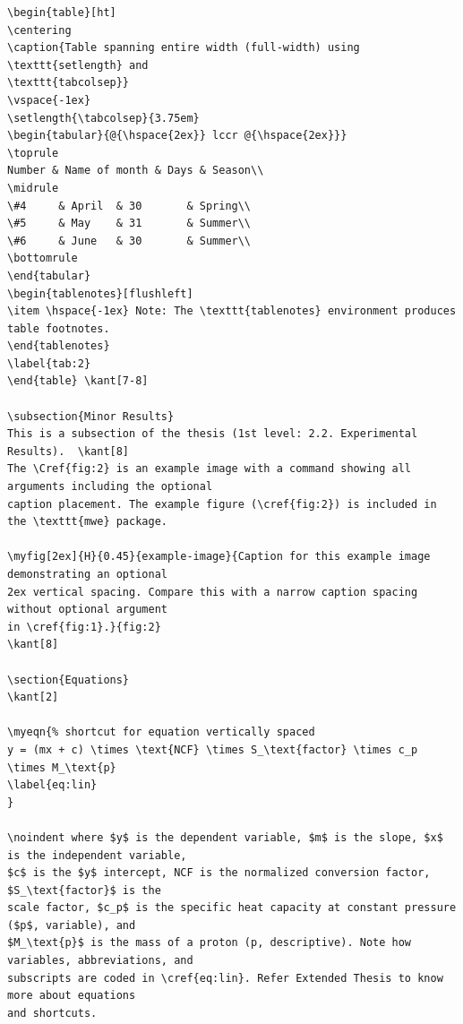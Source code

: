 \documentclass[letterpaper]{refart}
\begin{document}
{\begin{verbatim}
\begin{table}[ht]
\centering
\caption{Table spanning entire width (full-width) using \texttt{setlength} and
\texttt{tabcolsep}}
\vspace{-1ex}
\setlength{\tabcolsep}{3.75em}
\begin{tabular}{@{\hspace{2ex}} lccr @{\hspace{2ex}}}
\toprule
Number & Name of month & Days & Season\\
\midrule
\#4 	& April  & 30		& Spring\\
\#5 	& May    & 31		& Summer\\
\#6 	& June   & 30		& Summer\\
\bottomrule
\end{tabular}
\begin{tablenotes}[flushleft]
\item \hspace{-1ex} Note: The \texttt{tablenotes} environment produces table footnotes. 
\end{tablenotes}
\label{tab:2}
\end{table}	\kant[7-8]

\subsection{Minor Results}
This is a subsection of the thesis (1st level: 2.2. Experimental Results). 	\kant[8]
The \Cref{fig:2} is an example image with a command showing all arguments including the optional 
caption placement. The example figure (\cref{fig:2}) is included in the \texttt{mwe} package.

\myfig[2ex]{H}{0.45}{example-image}{Caption for this example image demonstrating an optional 
2ex vertical spacing. Compare this with a narrow caption spacing without optional argument 
in \cref{fig:1}.}{fig:2}    
\kant[8]

\section{Equations}
\kant[2]

\myeqn{% shortcut for equation vertically spaced
y = (mx + c) \times \text{NCF} \times S_\text{factor} \times c_p \times M_\text{p}
\label{eq:lin}
}

\noindent where $y$ is the dependent variable, $m$ is the slope, $x$ is the independent variable, 
$c$ is the $y$ intercept, NCF is the normalized conversion factor, $S_\text{factor}$ is the 
scale factor, $c_p$ is the specific heat capacity at constant pressure ($p$, variable), and 
$M_\text{p}$ is the mass of a proton (p, descriptive). Note how variables, abbreviations, and 
subscripts are coded in \cref{eq:lin}. Refer Extended Thesis to know more about equations 
and shortcuts. 


\end{verbatim}}
\end{document}
